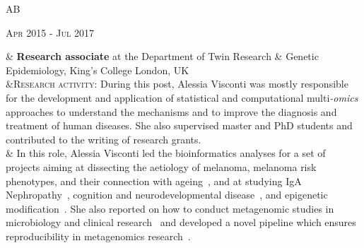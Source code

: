 \documentclass[a4paper,10pt]{article}
\newenvironment{doubletablelist}
{
	\vspace{-0.2cm}
	\begin{longtable}[!h]{AB}}{\end{longtable}
}
\newcommand{\dtlist}[2]{
\hspace{-3cm}
\noindent
	\begin{minipage}{0.22\textwidth}
	\begin{flushright}
	\textsc{#1}
	\end{flushright}
	\end{minipage}
	& #2\\[0.2cm]
}
\begin{document}
\begin{doubletablelist}
	
	\dtlist{Apr 2015 - Jul 2017}{\textbf{Research associate} at the Department of Twin Research \& Genetic Epidemiology, King's College London, UK \\ 
	&\textsc{Research activity}: During this post, Alessia Visconti was mostly responsible for the development and application of statistical and computational multi\emph{-omics} approaches to understand the mechanisms and to improve the diagnosis and treatment of human diseases. She also supervised master and PhD students and contributed to the writing of research grants.\\
	 & In this role, Alessia Visconti led the bioinformatics analyses for a set of projects aiming at dissecting the aetiology of melanoma, melanoma risk phenotypes, and their connection with ageing~\cite{Rib16,Hys18,Vis18a,Duf17}, and at studying IgA Nephropathy~\cite{Lom16}, cognition and neurodevelopmental disease~\cite{Cul18}, and epigenetic modification~\cite{Zag18}. 
	 She also reported on how to conduct metagenomic studies in microbiology and clinical research~\cite{Vis18c} and developed a novel pipeline which ensures reproducibility in metagenomics research~\cite{Vis18b}.%
	}
	

\end{doubletablelist}
\end{document}
